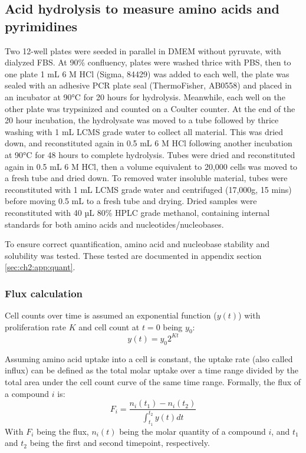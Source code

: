 \subsection{Acid hydrolysis to measure amino acids and pyrimidines}
Two 12-well plates were seeded in parallel in DMEM without pyruvate, with dialyzed FBS.
At 90\% confluency, plates were washed thrice with PBS, then to one plate 1 mL 6 M HCl (Sigma, 84429) was added to each well, the plate was sealed with an adhesive PCR plate seal (ThermoFisher, AB0558) and placed in an incubator at 90°C for 20 hours for hydrolysis.
Meanwhile, each well on the other plate was trypsinized and counted on a Coulter counter.
At the end of the 20 hour incubation, the hydrolysate was moved to a tube followed by thrice washing with 1 mL LCMS grade water to collect all material.
This was dried down, and reconstituted again in 0.5 mL 6 M HCl following another incubation at 90°C for 48 hours to complete hydrolysis.
Tubes were dried and reconstituted again in 0.5 mL 6 M HCl, then a volume equivalent to 20,000 cells was moved to a fresh tube and dried down.
To removed water insoluble material, tubes were reconstituted with 1 mL LCMS grade water and centrifuged (17,000g, 15 mins) before moving 0.5 mL to a fresh tube and drying.
Dried samples were reconstituted with 40 µL 80\% HPLC grade methanol, containing internal standards for both amino acids and nucleotides/nucleobases.

To ensure correct quantification, amino acid and nucleobase stability and solubility was tested.
These tested are documented in appendix section \ref{sec:ch2:app:quant}.


\subsubsection{Flux calculation}
Cell counts over time is assumed an exponential function ($y(t)$) with proliferation rate $K$ and cell count at $t=0$ being $y_0$:
\begin{equation}
    y(t) = y_0 2^{K t}
\end{equation}

Assuming amino acid uptake into a cell is constant, the uptake rate (also called influx) can be defined as the total molar uptake over a time range divided by the total area under the cell count curve of the same time range.
Formally, the flux of a compound $i$ is:
\begin{equation}
    F_i = \frac{n_i(t_1) - n_i(t_2)}{\int_{t_1}^{t_2} y(t) dt}
\end{equation}
With $F_i$ being the flux, $n_i(t)$ being the molar quantity of a compound $i$, and $t_1$ and $t_2$ being the first and second timepoint, respectively.

